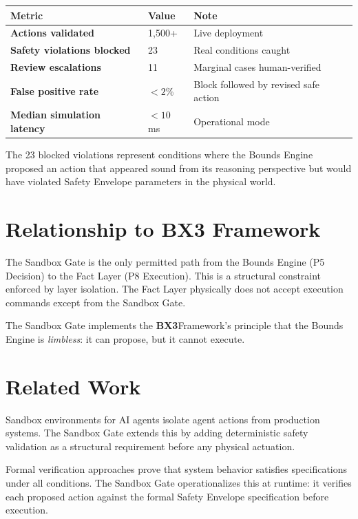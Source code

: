 \documentclass[12pt]{article}
\newcommand{\bxthree}{\textbf{BX3}}
\begin{document}
\begin{center}
\begin{tabular}{>{\bfseries}p{4cm} p{3cm} p{3cm}}
\toprule
\textbf{Metric} & \textbf{Value} & \textbf{Note} \\
\midrule
Actions validated & 1,500+ & Live deployment \\
\midrule
Safety violations blocked & 23 & Real conditions caught \\
\midrule
Review escalations & 11 & Marginal cases human-verified \\
\midrule
False positive rate & $<2$\% & Block followed by revised safe action \\
\midrule
Median simulation latency & $<10$\,ms & Operational mode \\
\bottomrule
\end{tabular}
\end{center}

The 23 blocked violations represent conditions where the Bounds Engine proposed an action that appeared sound from its reasoning perspective but would have violated Safety Envelope parameters in the physical world.

\section{Relationship to BX3 Framework}
\label{sec:relationship}

The Sandbox Gate is the only permitted path from the Bounds Engine (P5 Decision) to the Fact Layer (P8 Execution). This is a structural constraint enforced by layer isolation. The Fact Layer physically does not accept execution commands except from the Sandbox Gate.

The Sandbox Gate implements the \bxthree Framework's principle that the Bounds Engine is \textit{limbless}: it can propose, but it cannot execute.

\section{Related Work}
\label{sec:prior}

Sandbox environments for AI agents \cite{browser2024sandbox} isolate agent actions from production systems. The Sandbox Gate extends this by adding deterministic safety validation as a structural requirement before any physical actuation.

Formal verification approaches \cite{rashie2026} prove that system behavior satisfies specifications under all conditions. The Sandbox Gate operationalizes this at runtime: it verifies each proposed action against the formal Safety Envelope specification before execution.
\end{document}
